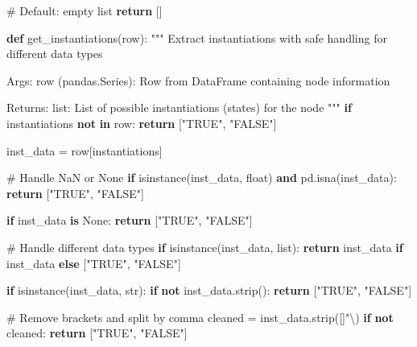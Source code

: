 \documentclass[
  11pt,
  letterpaper,
]{book}
\newenvironment{Shaded}{\begin{snugshade}}{\end{snugshade}}
\newcommand{\BuiltInTok}[1]{\textcolor[rgb]{0.00,0.23,0.31}{#1}}
\newcommand{\CharTok}[1]{\textcolor[rgb]{0.13,0.47,0.30}{#1}}
\newcommand{\CommentTok}[1]{\textcolor[rgb]{0.37,0.37,0.37}{#1}}
\newcommand{\ControlFlowTok}[1]{\textcolor[rgb]{0.00,0.23,0.31}{\textbf{#1}}}
\newcommand{\KeywordTok}[1]{\textcolor[rgb]{0.00,0.23,0.31}{\textbf{#1}}}
\newcommand{\NormalTok}[1]{\textcolor[rgb]{0.00,0.23,0.31}{#1}}
\newcommand{\OperatorTok}[1]{\textcolor[rgb]{0.37,0.37,0.37}{#1}}
\newcommand{\StringTok}[1]{\textcolor[rgb]{0.13,0.47,0.30}{#1}}
\newcommand{\VariableTok}[1]{\textcolor[rgb]{0.07,0.07,0.07}{#1}}
\begin{document}
\begin{Shaded}
\begin{Highlighting}[]
    \CommentTok{\# Default: empty list}
    \ControlFlowTok{return}\NormalTok{ []}

\KeywordTok{def}\NormalTok{ get\_instantiations(row):}
    \CommentTok{"""}
\CommentTok{    Extract instantiations with safe handling for different data types}

\CommentTok{    Args:}
\CommentTok{        row (pandas.Series): Row from DataFrame containing node information}

\CommentTok{    Returns:}
\CommentTok{        list: List of possible instantiations (states) for the node}
\CommentTok{    """}
    \ControlFlowTok{if} \StringTok{\textquotesingle{}instantiations\textquotesingle{}} \KeywordTok{not} \KeywordTok{in}\NormalTok{ row:}
        \ControlFlowTok{return}\NormalTok{ [}\StringTok{"TRUE"}\NormalTok{, }\StringTok{"FALSE"}\NormalTok{]}

\NormalTok{    inst\_data }\OperatorTok{=}\NormalTok{ row[}\StringTok{\textquotesingle{}instantiations\textquotesingle{}}\NormalTok{]}

    \CommentTok{\# Handle NaN or None}
    \ControlFlowTok{if} \BuiltInTok{isinstance}\NormalTok{(inst\_data, }\BuiltInTok{float}\NormalTok{) }\KeywordTok{and}\NormalTok{ pd.isna(inst\_data):}
        \ControlFlowTok{return}\NormalTok{ [}\StringTok{"TRUE"}\NormalTok{, }\StringTok{"FALSE"}\NormalTok{]}

    \ControlFlowTok{if}\NormalTok{ inst\_data }\KeywordTok{is} \VariableTok{None}\NormalTok{:}
        \ControlFlowTok{return}\NormalTok{ [}\StringTok{"TRUE"}\NormalTok{, }\StringTok{"FALSE"}\NormalTok{]}

    \CommentTok{\# Handle different data types}
    \ControlFlowTok{if} \BuiltInTok{isinstance}\NormalTok{(inst\_data, }\BuiltInTok{list}\NormalTok{):}
        \ControlFlowTok{return}\NormalTok{ inst\_data }\ControlFlowTok{if}\NormalTok{ inst\_data }\ControlFlowTok{else}\NormalTok{ [}\StringTok{"TRUE"}\NormalTok{, }\StringTok{"FALSE"}\NormalTok{]}

    \ControlFlowTok{if} \BuiltInTok{isinstance}\NormalTok{(inst\_data, }\BuiltInTok{str}\NormalTok{):}
        \ControlFlowTok{if} \KeywordTok{not}\NormalTok{ inst\_data.strip():}
            \ControlFlowTok{return}\NormalTok{ [}\StringTok{"TRUE"}\NormalTok{, }\StringTok{"FALSE"}\NormalTok{]}

        \CommentTok{\# Remove brackets and split by comma}
\NormalTok{        cleaned }\OperatorTok{=}\NormalTok{ inst\_data.strip(}\StringTok{\textquotesingle{}[]"}\CharTok{\textbackslash{}\textquotesingle{}}\StringTok{\textquotesingle{}}\NormalTok{)}
        \ControlFlowTok{if} \KeywordTok{not}\NormalTok{ cleaned:}
            \ControlFlowTok{return}\NormalTok{ [}\StringTok{"TRUE"}\NormalTok{, }\StringTok{"FALSE"}\NormalTok{]}


\end{Highlighting}
\end{Shaded}
\end{document}
